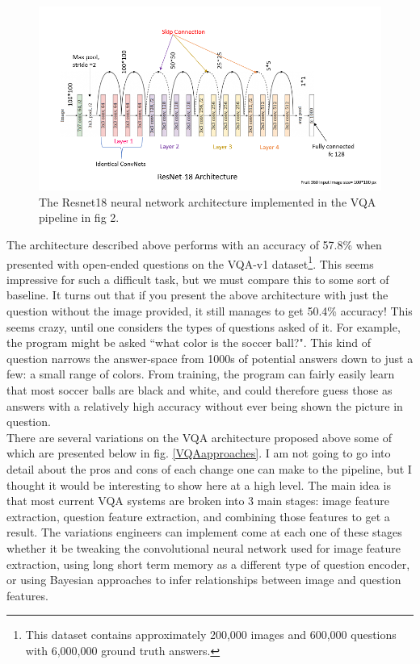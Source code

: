 \documentclass[manuscript,11pt]{article}
\begin{document}
\begin{figure}[h]
\centering
\includegraphics[scale=.5]{resnet}
\caption{The Resnet18 neural network architecture implemented in the VQA pipeline in fig 2.}
\label{resnet}
\end{figure} 

The architecture described above performs with an accuracy of 57.8\% when presented with open-ended questions on the VQA-v1 dataset\footnote{This dataset contains approximately 200,000 images and 600,000 questions with 6,000,000 ground truth answers.}. This seems impressive for such a difficult task, but we must compare this to some sort of baseline. It turns out that if you present the above architecture with just the question without the image provided, it still manages to get 50.4\% accuracy! This seems crazy, until one considers the types of questions asked of it. For example, the program might be asked ``what color is the soccer ball?". This kind of question narrows the answer-space from 1000s of potential answers down to just a few: a small range of colors. From training, the program can fairly easily learn that most soccer balls are black and white, and could therefore guess those as answers with a relatively high accuracy without ever being shown the picture in question.\\

There are several variations on the VQA architecture proposed above some of which are presented below in fig. \ref{VQAapproaches}. I am not going to go into detail about the pros and cons of each change one can make to the pipeline, but I thought it would be interesting to show here at a high level. The main idea is that most current VQA systems are broken into 3 main stages: image feature extraction, question feature extraction, and combining those features to get a result. The variations engineers can implement come at each one of these stages whether it be tweaking the convolutional neural network used for image feature extraction, using long short term memory as a different type of question encoder, or using Bayesian approaches to infer relationships between image and question features. \\
\end{document}

